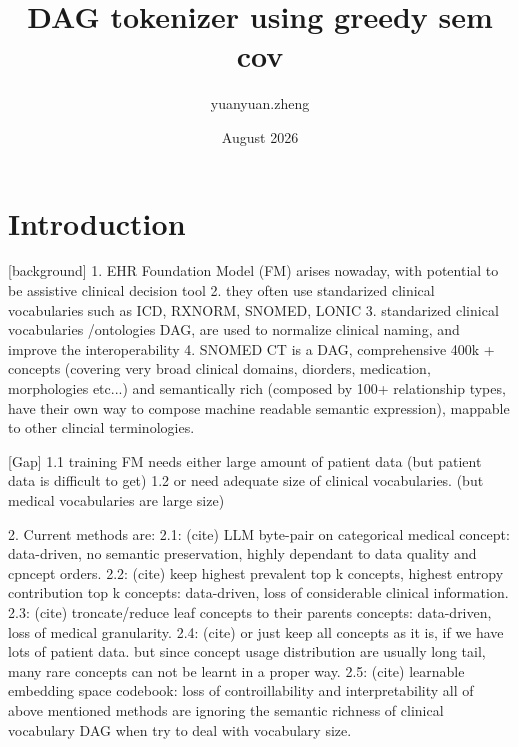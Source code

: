 \documentclass{article}
\title{DAG tokenizer using greedy sem cov}
\author{yuanyuan.zheng }
\date{August 2026}
\begin{document}
\maketitle

\iffalse

\section{Introduction}
[background]
1. EHR Foundation Model (FM) arises nowaday, with potential to be assistive clinical decision tool
2. they often use standarized clinical vocabularies such as ICD, RXNORM, SNOMED, LONIC
3. standarized clinical vocabularies /ontologies DAG, are used to normalize clinical naming, and improve the interoperability
4. SNOMED CT is a DAG, comprehensive 400k + concepts (covering very broad clinical domains, diorders, medication, morphologies etc...) and semantically rich (composed by 100+ relationship types, have their own way to compose machine readable semantic expression), mappable to other clincial terminologies.

[Gap]
1.1 training FM needs either large amount of patient data (but patient data is difficult to get)
1.2 or need adequate size of clinical vocabularies. (but medical vocabularies are large size)

2. Current methods are:
2.1: (cite) LLM byte-pair on categorical medical concept: data-driven, no semantic preservation, highly dependant to data quality and cpncept orders.
2.2: (cite) keep highest prevalent top k concepts, highest entropy contribution top k concepts: data-driven, loss of considerable clinical information.
2.3: (cite) troncate/reduce leaf concepts to their parents concepts: data-driven, loss of medical granularity.
2.4: (cite) or just keep all concepts as it is, if we have lots of patient data. but since concept usage distribution are usually long tail, many rare concepts can not be learnt in a proper way.
2.5: (cite) learnable embedding space codebook: loss of controillability and interpretability
all of above mentioned methods are ignoring the semantic richness of clinical vocabulary DAG when try to deal with vocabulary size.
\end{document}
